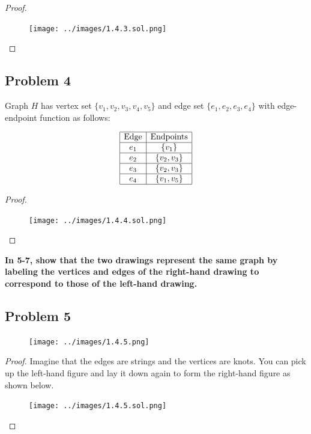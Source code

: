 \documentclass[14pt]{extarticle}
\begin{document}
\begin{proof}
    \begin{figure}[ht!]
        \centering
        \texttt{[image: ../images/1.4.3.sol.png]}
    \end{figure}
\end{proof}

\subsection{Problem 4}
Graph $H$ has vertex set $\{v_1, v_2, v_3, v_4, v_5\}$ and edge set $\{e_1,
    e_2, e_3, e_4\}$ with edge-endpoint function as follows:

$$
    \begin{array}{|c|c|}
        \hline
        \text{Edge} & \text{Endpoints} \\
        \hline
        e_1         & \{v_1\}          \\
        \hline
        e_2         & \{v_2, v_3\}     \\
        \hline
        e_3         & \{v_2, v_3\}     \\
        \hline
        e_4         & \{v_1, v_5\}     \\
        \hline
    \end{array}
$$

\begin{proof}
    \begin{figure}[ht!]
        \centering
        \texttt{[image: ../images/1.4.4.sol.png]}
    \end{figure}
\end{proof}

{\bf In 5-7, show that the two drawings represent the same graph by labeling
the vertices and edges of the right-hand drawing to correspond to those of the
left-hand drawing.}

\subsection{Problem 5}

\begin{figure}[ht!]
    \centering
    \texttt{[image: ../images/1.4.5.png]}
\end{figure}

\begin{proof}
    Imagine that the edges are strings and the vertices are knots. You can pick up
    the left-hand figure and lay it down again to form the right-hand figure as
    shown below.

    \begin{figure}[ht!]
        \centering
        \texttt{[image: ../images/1.4.5.sol.png]}
    \end{figure}
\end{proof}
\end{document}
